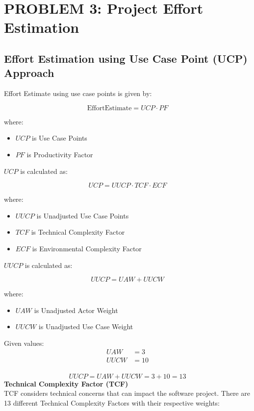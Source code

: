 \documentclass[runningheads]{llncs}
\begin{document}
\newpage
\section{PROBLEM 3: Project Effort Estimation}
\subsection{Effort Estimation using Use Case Point (UCP) Approach}
Effort Estimate using use case points is given by:

\[
\text{EffortEstimate} = UCP \cdot PF
\]

where:
\begin{itemize}
    \item $UCP$ is Use Case Points
    \item $PF$ is Productivity Factor
\end{itemize}

$UCP$ is calculated as:

\[
UCP = UUCP \cdot TCF \cdot ECF
\]

where:
\begin{itemize}
    \item $UUCP$ is Unadjusted Use Case Points
    \item $TCF$ is Technical Complexity Factor
    \item $ECF$ is Environmental Complexity Factor
\end{itemize}

$UUCP$ is calculated as:

\[
UUCP = UAW + UUCW
\]

where:
\begin{itemize}
    \item $UAW$ is Unadjusted Actor Weight
    \item $UUCW$ is Unadjusted Use Case Weight
\end{itemize}

Given values:
\begin{align*}
    UAW &= 3 \\
    UUCW &= 10 \\
\end{align*}

\[
UUCP = UAW + UUCW = 3 + 10 = 13
\]
\textbf{Technical Complexity Factor (TCF)}\\
TCF considers technical concerns that can impact the software project. There are 13 different Technical Complexity Factors with their respective weights:
\end{document}
